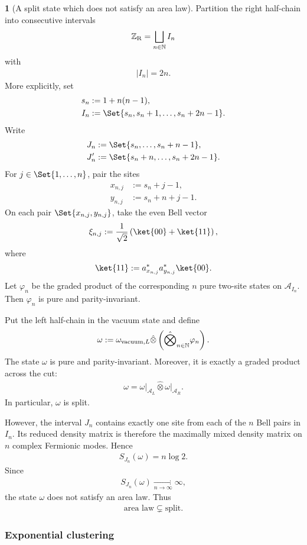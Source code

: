 \documentclass[a4paper,10pt]{article}
\numberwithin{equation}{section}
\theoremstyle{plain}
\theoremstyle{plain}
\theoremstyle{plain}
\theoremstyle{plain}
\theoremstyle{plain}
\theoremstyle{remark}
\theoremstyle{definition}
\newtheorem{example}[example]{\protect\examplename}
\providecommand{\examplename}{Example}
\newcommand{\ZZ}{\mathbb{Z}}
\newcommand{\NN}{\mathbb{N}}
\newcommand{\calA}{\mathcal{A}}
\newcommand{\eq}[1]{\begin{align*}#1\end{align*}}
\newcommand{\eql}[1]{\begin{align}#1\end{align}}
\newcommand{\br}[1]{\left(#1\right)}
\begin{document}
\begin{example}[A split state which does not satisfy an area law]
\label{ex:split not area law}
Partition the right half-chain into consecutive intervals
\eq{
    \ZZ_{\rm R}
    =
    \bigsqcup_{n\in\NN}
    I_n
}
with
\eq{
    |I_n|
    =
    2n.
}
More explicitly, set
\eq{
    s_n
    &:=
    1+n(n-1),\\
    I_n
    &:=
    \Set{
        s_n,
        s_n+1,
        \ldots,
        s_n+2n-1
    }.
}
Write
\eq{
    J_n
    &:=
    \Set{
        s_n,
        \ldots,
        s_n+n-1
    },\\
    J_n'
    &:=
    \Set{
        s_n+n,
        \ldots,
        s_n+2n-1
    }.
}
For $j\in\Set{1,\ldots,n}$, pair the sites
\eq{
    x_{n,j}
    &:=
    s_n+j-1,\\
    y_{n,j}
    &:=
    s_n+n+j-1.
}
On each pair $\Set{x_{n,j},y_{n,j}}$, take the even Bell vector
\eq{
    \xi_{n,j}
    :=
    \frac{1}{\sqrt{2}}
    \br{
        \ket{00}
        +
        \ket{11}
    },
}
where
\eq{
    \ket{11}
    :=
    a_{x_{n,j}}^*
    a_{y_{n,j}}^*
    \ket{00}.
}
Let $\varphi_n$ be the graded product of the corresponding $n$ pure
two-site states on $\calA_{I_n}$. Then $\varphi_n$ is pure and
parity-invariant.

Put the left half-chain in the vacuum state and define
\eql{\label{eq:split volume entangled blocks}
    \omega
    :=
    \omega_{{\rm vacuum},L}
    \hat{\otimes}
    \left(
        \hat{\bigotimes}_{n\in\NN}
        \varphi_n
    \right).
}
The state $\omega$ is pure and parity-invariant. Moreover, it is exactly
a graded product across the cut:
\eq{
    \omega
    =
    \left.\omega\right|_{\calA_L}
    \hat{\otimes}
    \left.\omega\right|_{\calA_R}.
}
In particular, $\omega$ is split.

However, the interval $J_n$ contains exactly one site from each of the
$n$ Bell pairs in $I_n$. Its reduced density matrix is therefore the
maximally mixed density matrix on $n$ complex Fermionic modes. Hence
\eq{
    S_{J_n}(\omega)
    =
    n\log2.
}
Since
\eq{
    S_{J_n}(\omega)
    \xrightarrow[n\to\infty]{}
    \infty,
}
the state $\omega$ does not satisfy an area law. Thus
\eq{
    \text{area law}
    \subsetneq
    \text{split}.
}
\end{example}



\subsubsection*{Exponential clustering}
\end{document}
